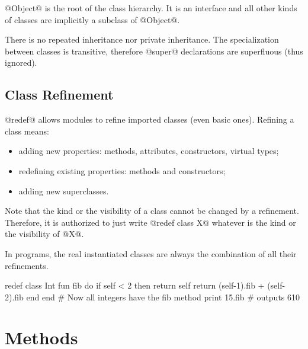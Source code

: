 @Object@ is the root of the class hierarchy.
It is an interface and all other kinds of classes are implicitly a subclass of @Object@.

There is no repeated inheritance nor private inheritance.
The specialization between classes is transitive, therefore @super@ declarations are superfluous (thus ignored).

\subsection{Class Refinement}\label{refine}

@redef@ allows modules to refine imported classes (even basic ones).
Refining a class means:
\begin{itemize}
\item adding new properties: methods, attributes, constructors, virtual types;
\item redefining existing properties: methods and constructors;
\item adding new superclasses.
\end{itemize}

Note that the kind or the visibility of a class cannot be changed by a refinement.
Therefore, it is authorized to just write @redef class X@ whatever is the kind or the visibility of @X@.

In programs, the real instantiated classes are always the combination of all their refinements.

\begin{lst}
redef class Int
	fun fib
	do
		if self < 2 then return self
		return (self-1).fib + (self-2).fib
	end
end
# Now all integers have the fib method
print 15.fib # outputs 610
\end{lst}

\section{Methods}\label{fun}\label{self}\label{return}

